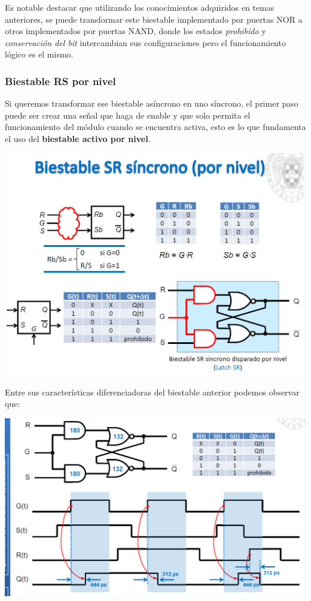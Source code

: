 \documentclass[a4paper,10pt]{book}
\begin{document}
Es notable destacar que utilizando los conocimientos adquiridos en temas anteriores, se puede transformar este biestable implementado por puertas NOR a otros implementados por puertas NAND, donde los estados \textit{prohibido} y \textit{conservación del bit} intercambian sus configuraciones pero el funcionamiento lógico es el mismo.

\subsubsection*{Biestable RS por nivel}
Si queremos transformar ese biestable asíncrono en uno síncrono, el primer paso puede ser crear una señal que haga de enable y que solo permita el funcionamiento del módulo cuando se encuentra activa, esto es lo que fundamenta el uso del \textbf{biestable activo por nivel}.

\begin{center}
\includegraphics[scale=0.5]{biestable por nivel}
\end{center}

Entre sus características diferenciadoras del biestable anterior podemos observar que:
\begin{center}
\includegraphics[scale=0.5]{cronograma biestable por nivel}
\end{center}
\end{document}
